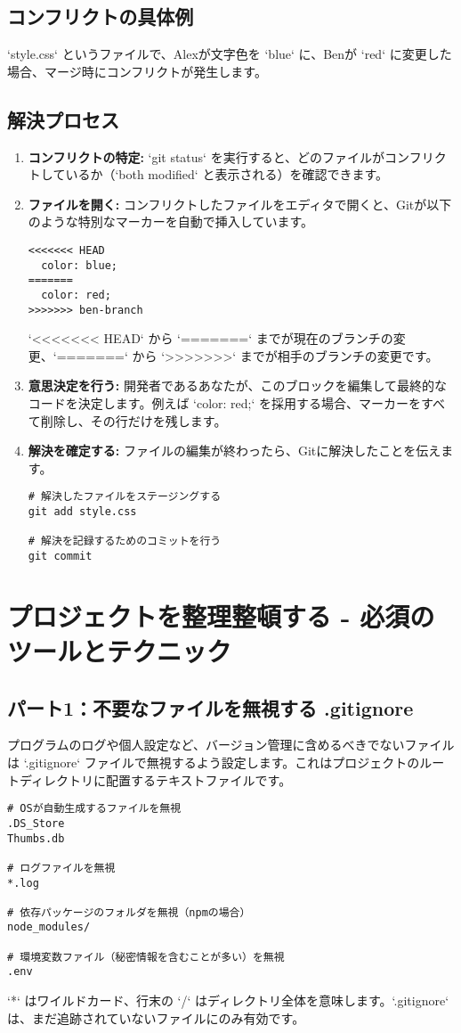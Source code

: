 \documentclass{ltjsarticle}
\begin{document}
\subsection{コンフリクトの具体例}
`style.css` というファイルで、Alexが文字色を `blue` に、Benが `red` に変更した場合、マージ時にコンフリクトが発生します。

\subsection{解決プロセス}
\begin{enumerate}
    \item \textbf{コンフリクトの特定:} `git status` を実行すると、どのファイルがコンフリクトしているか（`both modified` と表示される）を確認できます。
    \item \textbf{ファイルを開く:} コンフリクトしたファイルをエディタで開くと、Gitが以下のような特別なマーカーを自動で挿入しています。
    \begin{verbatim}
<<<<<<< HEAD
  color: blue;
=======
  color: red;
>>>>>>> ben-branch
\end{verbatim}
    `<<<<<<< HEAD` から `=======` までが現在のブランチの変更、`=======` から `>>>>>>>` までが相手のブランチの変更です。
    \item \textbf{意思決定を行う:} 開発者であるあなたが、このブロックを編集して最終的なコードを決定します。例えば `color: red;` を採用する場合、マーカーをすべて削除し、その行だけを残します。
    \item \textbf{解決を確定する:} ファイルの編集が終わったら、Gitに解決したことを伝えます。
    \begin{verbatim}
# 解決したファイルをステージングする
git add style.css

# 解決を記録するためのコミットを行う
git commit
\end{verbatim}
\end{enumerate}

\section{プロジェクトを整理整頓する - 必須のツールとテクニック}
\subsection{パート1：不要なファイルを無視する .gitignore}
プログラムのログや個人設定など、バージョン管理に含めるべきでないファイルは `.gitignore` ファイルで無視するよう設定します。これはプロジェクトのルートディレクトリに配置するテキストファイルです。
\begin{verbatim}
# OSが自動生成するファイルを無視
.DS_Store
Thumbs.db

# ログファイルを無視
*.log

# 依存パッケージのフォルダを無視（npmの場合）
node_modules/

# 環境変数ファイル（秘密情報を含むことが多い）を無視
.env
\end{verbatim}
`*` はワイルドカード、行末の `/` はディレクトリ全体を意味します。`.gitignore` は、まだ追跡されていないファイルにのみ有効です。
\end{document}
